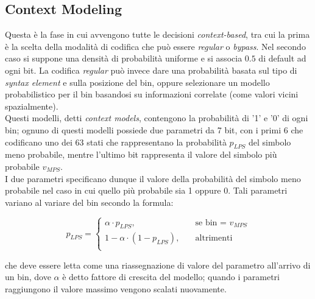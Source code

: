 \subsection{Context Modeling}\label{ref-context-modeling}
Questa è la fase in cui avvengono tutte le decisioni \emph{context-based}, tra
cui la prima è la scelta della modalità di codifica che può essere 
\emph{regular} o \emph{bypass}. Nel secondo caso si suppone una densità di 
probabilità
uniforme e si associa $0.5$ di default ad ogni bit. La codifica \emph{regular}
può invece dare una probabilità basata sul tipo di \emph{syntax element} e sulla
posizione del bin, oppure selezionare un modello probabilistico per il bin 
basandosi su informazioni correlate (come valori vicini spazialmente). \\
Questi modelli, detti \emph{context models}, contengono la probabilità di '1' e
'0' di ogni bin; ognuno di questi modelli possiede due parametri  da 7 bit, con
i primi 6 che codificano uno dei 63 stati che rappresentano la probabilità 
$p_{LPS}$ del simbolo meno probabile, mentre l'ultimo bit rappresenta il valore 
del simbolo più probabile $v_{MPS}$. \\
I due parametri specificano dunque il valore della probabilità del simbolo meno
probabile nel caso in cui quello più probabile sia 1 oppure 0. Tali parametri 
variano al variare del bin secondo la formula:

\[ p_{LPS} = 
\begin{cases}
  \alpha\cdot p_{LPS},         & \quad \text{se bin = } v_{MPS} \\
  1- \alpha\cdot(1-p_{LPS}),   & \quad \text{altrimenti} \\
\end{cases}
\]

che deve essere letta come una riassegnazione di valore del parametro all'arrivo
di un bin, dove $\alpha$ è detto fattore di crescita del modello; quando i 
parametri raggiungono il valore massimo vengono scalati
nuovamente.

